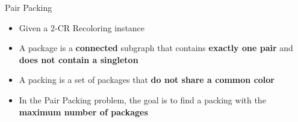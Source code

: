\begin{frame}{Pair Packing}
\begin{itemize}


\item 
Given a 2-CR Recoloring instance

\pause\item
A \alert{package} 
is a \textbf{connected} subgraph that contains \textbf{exactly one pair} 
and \textbf{does not contain a singleton} 
 
\pause\item
A \alert{packing} is a set of packages that \textbf{do not share a common color}

\pause\item
In the \alert{Pair Packing} problem,
the goal is to find a packing with the \textbf{maximum number of packages} 


\end{itemize}
\end{frame}